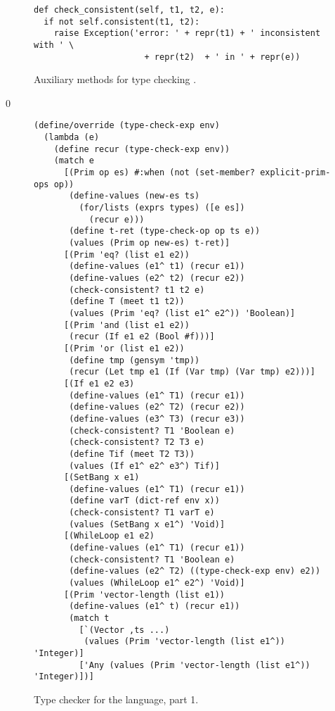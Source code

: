\documentclass[7x10]{TimesAPriori_MIT}%
\def\racketEd{0}
\def\edition{1}
\numberwithin{theorem}{chapter}
\numberwithin{definition}{chapter}
\numberwithin{equation}{chapter}
\begin{document}
{\begin{figure}[tbp]
\begin{tcolorbox}[colback=white]
\begin{lstlisting}
def check_consistent(self, t1, t2, e):
  if not self.consistent(t1, t2):
    raise Exception('error: ' + repr(t1) + ' inconsistent with ' \
                      + repr(t2)  + ' in ' + repr(e))
\end{lstlisting}
\end{tcolorbox}

\caption{Auxiliary methods for type checking \LangGrad{}.}
\label{fig:type-check-Lgradual-aux}
\end{figure}

\fi}


{\if\edition\racketEd        
\begin{figure}[tbp]
\begin{tcolorbox}[colback=white]  
\begin{lstlisting}[basicstyle=\ttfamily\footnotesize]
(define/override (type-check-exp env)
  (lambda (e)
    (define recur (type-check-exp env))
    (match e
      [(Prim op es) #:when (not (set-member? explicit-prim-ops op))
       (define-values (new-es ts)
         (for/lists (exprs types) ([e es])
           (recur e)))
       (define t-ret (type-check-op op ts e))
       (values (Prim op new-es) t-ret)]
      [(Prim 'eq? (list e1 e2))
       (define-values (e1^ t1) (recur e1))
       (define-values (e2^ t2) (recur e2))
       (check-consistent? t1 t2 e)
       (define T (meet t1 t2))
       (values (Prim 'eq? (list e1^ e2^)) 'Boolean)]
      [(Prim 'and (list e1 e2))
       (recur (If e1 e2 (Bool #f)))]
      [(Prim 'or (list e1 e2))
       (define tmp (gensym 'tmp))
       (recur (Let tmp e1 (If (Var tmp) (Var tmp) e2)))]
      [(If e1 e2 e3)
       (define-values (e1^ T1) (recur e1))
       (define-values (e2^ T2) (recur e2))
       (define-values (e3^ T3) (recur e3))
       (check-consistent? T1 'Boolean e)
       (check-consistent? T2 T3 e)
       (define Tif (meet T2 T3))
       (values (If e1^ e2^ e3^) Tif)]
      [(SetBang x e1)
       (define-values (e1^ T1) (recur e1))
       (define varT (dict-ref env x))
       (check-consistent? T1 varT e)
       (values (SetBang x e1^) 'Void)]
      [(WhileLoop e1 e2)
       (define-values (e1^ T1) (recur e1))
       (check-consistent? T1 'Boolean e)
       (define-values (e2^ T2) ((type-check-exp env) e2))
       (values (WhileLoop e1^ e2^) 'Void)]
      [(Prim 'vector-length (list e1))
       (define-values (e1^ t) (recur e1))
       (match t
         [`(Vector ,ts ...)
          (values (Prim 'vector-length (list e1^)) 'Integer)]
         ['Any (values (Prim 'vector-length (list e1^)) 'Integer)])]
\end{lstlisting}
\end{tcolorbox}
\caption{Type checker for the \LangGrad{} language, part 1.}
\label{fig:type-check-Lgradual-1}
\end{figure}

}
\end{document}
